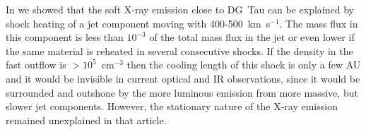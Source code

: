 In \citet{2009A&A...493..579G} we showed that the soft X-ray emission close to DG~Tau can be explained by shock heating of a jet component moving with 400-500~km~s$^{-1}$. The mass flux in this component is less than $10^{-3}$ of the total mass flux in the jet or even lower if the same material is reheated in several consecutive shocks. If the density in the fast outflow is $>10^5$~cm$^{-3}$ then the cooling length of this shock is only a few AU and it would be invisible in current optical and IR observations, since it would be surrounded and outshone by the more luminous emission from more massive, but slower jet components. However, the stationary nature of the X-ray emission remained unexplained in that article.